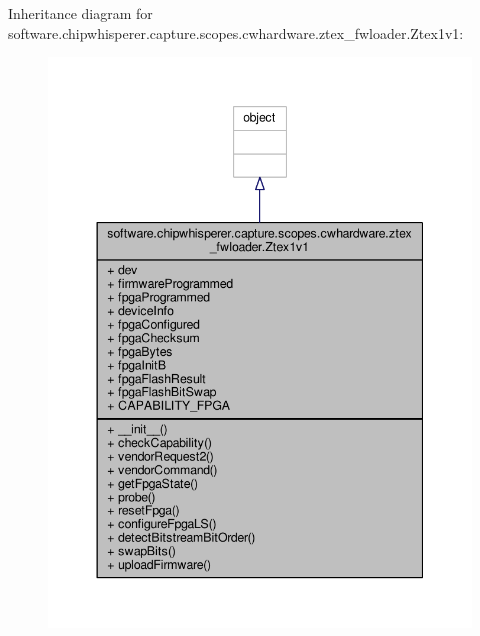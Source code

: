 Inheritance diagram for software.\+chipwhisperer.\+capture.\+scopes.\+cwhardware.\+ztex\+\_\+fwloader.\+Ztex1v1\+:\nopagebreak
\begin{figure}[H]
\begin{center}
\leavevmode
\includegraphics[width=344pt]{d0/d3b/classsoftware_1_1chipwhisperer_1_1capture_1_1scopes_1_1cwhardware_1_1ztex__fwloader_1_1Ztex1v1__inherit__graph}
\end{center}
\end{figure}


